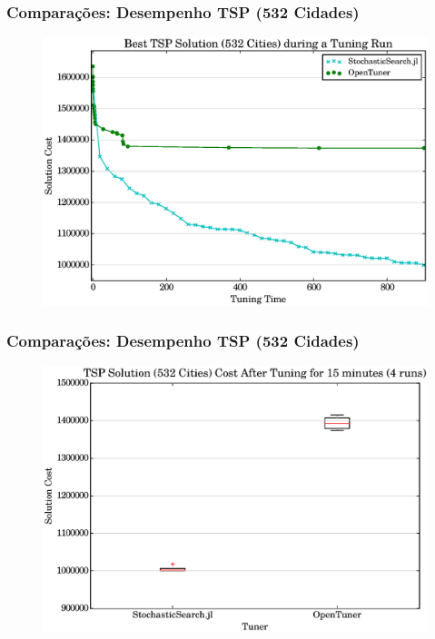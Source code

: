 \documentclass[10pt, compress]{beamer}
\begin{document}
\begin{frame}[fragile]
    \frametitle{Comparações: Desempenho TSP (532 Cidades)}
    \begin{figure}[H]
        \centering
        \includegraphics[width=1\textwidth]{att532_15min_best_comparison}
    \end{figure}%
\end{frame}

\begin{frame}[fragile]
    \frametitle{Comparações: Desempenho TSP (532 Cidades)}
    \begin{figure}[H]
        \centering
        \includegraphics[width=1\textwidth]{att532_15min_comparison}
    \end{figure}%
\end{frame}
\end{document}
